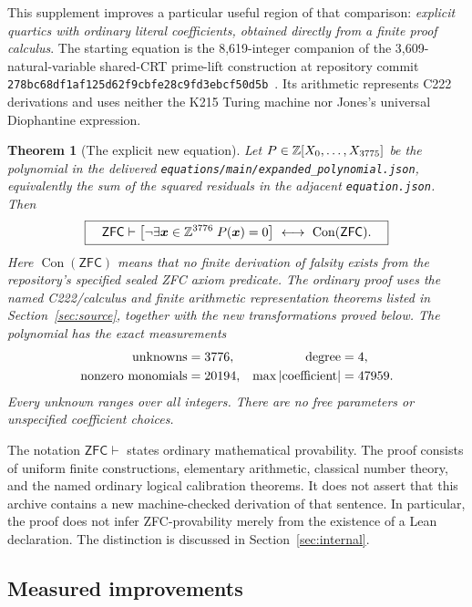 \documentclass[11pt,letterpaper]{article}
\newtheorem{theorem}{Theorem}[section]
\theoremstyle{definition}
\newcommand{\Z}{\mathbb Z}
\newcommand{\Con}{\operatorname{Con}}
\newcommand{\ZFC}{\mathsf{ZFC}}
\begin{document}
This supplement improves a particular useful region of that comparison:
\emph{explicit quartics with ordinary literal coefficients, obtained
directly from a finite proof calculus}. The starting equation is the
8,619-integer companion of the 3,609-natural-variable shared-CRT prime-lift
construction at repository commit
\texttt{278bc68df1af125d62f9cbfe28c9fd3ebcf50d5b}~\cite{repo-integer,repo-prime}.
Its arithmetic represents C222 derivations and uses neither the K215
Turing machine nor Jones's universal Diophantine expression.

\begin{theorem}[The explicit new equation]
\label{thm:main}
Let $P\in\Z[X_0,\ldots,X_{\MainLast}]$ be the polynomial in the delivered
\texttt{equations/main/expanded\_polynomial.json}, equivalently the sum of
the squared residuals in the adjacent \texttt{equation.json}. Then
\[
\boxed{\quad
\ZFC\vdash
\left[\neg\exists\boldsymbol x\in\Z^{\MainVars}\;
P(\boldsymbol x)=0\right]\ \longleftrightarrow\ \Con(\ZFC).
\quad}
\]
Here $\Con(\ZFC)$ means that no finite derivation of falsity exists from
the repository's specified sealed ZFC axiom predicate. The ordinary proof
uses the named C222/calculus and finite arithmetic representation theorems
listed in Section~\ref{sec:source}, together with the new transformations
proved below. The polynomial has the exact measurements
\[
\begin{aligned}
\text{unknowns}&=3776,&
\text{degree}&=4,\\
\text{nonzero monomials}&=20194,&
\max|\text{coefficient}|&=47959.
\end{aligned}
\]
Every unknown ranges over \emph{all} integers. There are no free
parameters or unspecified coefficient choices.
\end{theorem}

The notation $\ZFC\vdash$ states ordinary mathematical provability. The
proof consists of uniform finite constructions, elementary arithmetic,
classical number theory, and the named ordinary logical calibration
theorems. It does not assert that this archive contains a new
machine-checked derivation of that sentence. In particular, the proof
does not infer ZFC-provability merely from the existence of a Lean
declaration. The distinction is discussed in Section~\ref{sec:internal}.

\subsection{Measured improvements}
\end{document}
